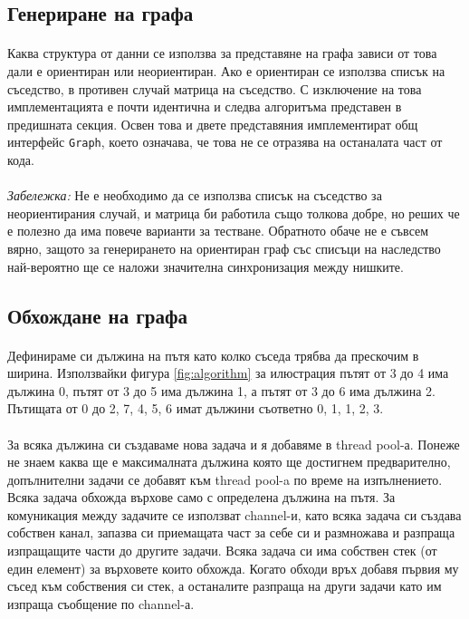 \subsection*{Генериране на графа}

\paragraph*{} Каква структура от данни се използва за представяне на графа зависи от това дали е ориентиран или неориентиран. Ако е ориентиран се използва списък на съседство, в противен случай матрица на съседство. С изключение на това имплементацията е почти идентична и следва алгоритъма представен в предишната секция. Освен това и двете представяния имплементират общ интерфейс \verb|Graph|, което означава, че това не се отразява на останалата част от кода.

\paragraph*{} \emph{Забележка:} Не е необходимо да се използва списък на съседство за неориентирания случай, и матрица би работила също толкова добре, но реших че е полезно да има повече варианти за тестване. Обратното обаче не е съвсем вярно, защото за генерирането на ориентиран граф със списъци на наследство най-вероятно ще се наложи значителна синхронизация между нишките.

\subsection*{Обхождане на графа}

\paragraph*{} Дефинираме си дължина на пътя като колко съседа трябва да прескочим в ширина. Използвайки фигура \ref{fig:algorithm} за илюстрация пътят от 3 до 4 има дължина 0, пътят от 3 до 5 има дължина 1, а пътят от 3 до 6 има дължина 2. Пътищата от 0 до 2, 7, 4, 5, 6 имат дължини съответно 0, 1, 1, 2, 3.

\paragraph*{} За всяка дължина си създаваме нова задача и я добавяме в thread pool-а. Понеже не знаем каква ще е максималната дължина която ще достигнем предварително, допълнителни задачи се добавят към thread pool-a по време на изпълнението. Всяка задача обхожда върхове само с определена дължина на пътя. За комуникация между задачите се използват channel-и, като всяка задача си създава собствен канал, запазва си приемащата част за себе си и размножава и разпраща изпращащите части до другите задачи. Всяка задача си има собствен стек (от един елемент) за върховете които обхожда. Когато обходи връх добавя първия му съсед към собствения си стек, а останалите разпраща на други задачи като им изпраща съобщение по channel-а.

